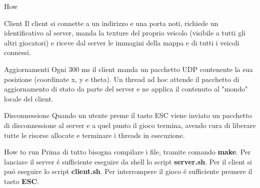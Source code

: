 \documentclass[12pt]{article}
\begin{document}
\begin{section}{How}
\begin{subsection}{Client}
Il client si connette a un indirizzo e una porta noti, richiede un identificativo al server, manda la texture del proprio veicolo (visibile a tutti gli altri giocatori) e riceve dal server le immagini della mappa e di tutti i veicoli connessi.
\begin{subsubsection}{Aggiornamenti}
Ogni 300 ms il client manda  un pacchetto UDP contenente la sua posizione (coordinate x, y e theta). Un thread ad hoc attende il pacchetto di aggiornamento di stato da parte del server e ne applica il contenuto al "mondo" locale del client.
\end{subsubsection}
\begin{subsubsection}{Disconnessione}
Quando un utente preme il tasto ESC viene inviato un pacchetto di disconnessione al server e a quel punto il gioco termina, avendo cura di liberare tutte le risorse allocate e terminare i threads in esecuzione.
\end{subsubsection}
\end{subsection}
\end{section}

\begin{section}{How to run}
Prima di tutto bisogna compilare i file, tramite comando \textbf{make}.
\newline\newline
Per lanciare il server \'{e} sufficiente eseguire da shell lo script \textbf{server.sh}.
\newline
Per il client si pu\'{o} eseguire lo script \textbf{client.sh}.
\newline\newline
Per interrompere il gioco \'{e} sufficiente premere il tasto \textbf{ESC}.
\end{section}
\end{document}
